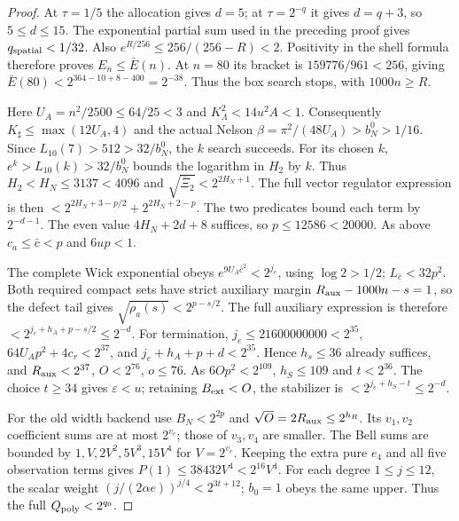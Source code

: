 \documentclass[11pt]{article}
\theoremstyle{plain}
\theoremstyle{definition}
\theoremstyle{remark}
\begin{document}
\begin{proof}
At $\tau=1/5$ the allocation gives $d=5$; at $\tau=2^{-q}$ it gives
$d=q+3$, so $5\le d\le15$. The exponential partial sum used in the
preceding proof gives $q_{\rm spatial}<1/32$.
Also $e^{R/256}\le256/(256-R)<2$. Positivity in the shell formula
therefore proves $E_n\le\bar E(n)$. At $n=80$ its bracket is
$159776/961<256$, giving $\bar E(80)<2^{364-10+8-400}=2^{-38}$.
Thus the box search stops, with $1000n\ge R$.

Here $U_A=n^2/2500\le64/25<3$ and
$K_\Lambda^2<14u^2A<1$. Consequently
$K_\sharp\le\max(12U_A,4)$ and the actual Nelson
$\beta=\pi^2/(48U_A)>b_N^0>1/16$.
Since $L_{10}(7)>512>32/b_N^0$, the $k$ search succeeds.
For its chosen $k$, $e^k>L_{10}(k)>32/b_N^0$ bounds the logarithm
in $H_2$ by $k$. Thus $H_2<H_N\le3137<4096$ and
$\sqrt{\bar\Xi_2}<2^{2H_N+1}$.
The full vector regulator expression is then
$<2^{2H_N+3-p/2}+2^{2H_N+2-p}$.
The two predicates bound each term by $2^{-d-1}$.
The even value $4H_N+2d+8$ suffices, so $p\le12586<20000$.
As above $c_a\le\bar c<p$ and $6up<1$.

The complete Wick exponential obeys
$e^{9U_A\bar c^2}<2^{j_e}$, using $\log2>1/2$;
$L_{\bar c}<32p^2$. Both required compact sets have strict auxiliary
margin $R_{\rm aux}-1000n-s=1$, so the defect tail gives
$\sqrt{\rho_a(s)}<2^{p-s/2}$.
The full auxiliary expression is therefore
$<2^{j_e+h_A+p-s/2}\le2^{-d}$.
For termination, $j_e\le21600000000<2^{35}$,
$64U_Ap^2+4c_r<2^{37}$, and
$j_e+h_A+p+d<2^{35}$. Hence $h_s\le36$ already suffices, and
$R_{\rm aux}<2^{37}$, $O<2^{76}$, $o\le76$.
As $6Op^2<2^{109}$, $h_S\le109$ and $t<2^{36}$.
The choice $t\ge34$ gives $\varepsilon<u$; retaining
$B_{\rm ext}<O$, the stabilizer is
$<2^{j_e+h_S-t}\le2^{-d}$.

For the old width backend use $B_N<2^{2p}$ and
$\sqrt O=2R_{\rm aux}\le2^{h_R}$. Its $v_1,v_2$ coefficient sums
are at most $2^{v_e}$; those of $v_3,v_4$ are smaller.
The Bell sums are bounded by $1,V,2V^2,5V^3,15V^4$ for $V=2^{v_e}$.
Keeping the extra pure $e_4$ and all five observation terms gives
$P(1)\le38432V^4<2^{16}V^4$.
For each degree $1\le j\le12$, the scalar weight
$(j/(2\alpha e))^{j/4}<2^{3t+12}$; $b_0=1$ obeys the same upper.
Thus the full $Q_{\rm poly}<2^{q_0}$.


\end{proof}
\end{document}
